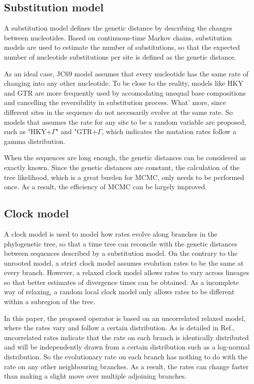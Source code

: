 \documentclass{bmcart}
\begin{document}
\subsection*{Substitution model}
A substitution model defines the genetic distance by describing the changes between nucleotides. Based on continuous-time Markov chains, substitution models are used to estimate the number of substitutions, so that the expected number of nucleotide substitutions per site is defined as the genetic distance.

As an ideal case, JC69 model assumes that every nucleotide has the same rate of changing into any other nucleotide\cite{jukes1969evolution}. To be close to the reality, models like HKY and GTR are more frequently used by accomodating unequal base compositions and cancelling the reversibility in substitution process\cite{hasegawa1985dating,zharkikh1994estimation}. What' more, since different sites in the sequence  do not necessarily evolve at the same rate. So models that assumes the rate for any site to be a random variable are proposed, such as "HKY+$\Gamma $" and "GTR+$\Gamma $, which indicates the mutation rates follow a gamma distribution.

When the sequences are long enough, the genetic distances can be considered as exactly known. Since the genetic distances are constant, the calculation of the tree likelihood, which is a great burden for MCMC, only needs to be performed once. As a result, the efficiency of MCMC can be largely improved.
\subsection{Clock model}
A clock model is used to model how rates evolve along branches in the phylogenetic tree, so that a time tree can reconcile with the genetic distances between sequences described by a substitution model. On the contrary to the unrooted model, a strict clock model assumes evolution rates to be the same at every branch. However, a relaxed clock model allows rates to vary across lineages so that better estimates of divergence times can be obtained. As a incomplete way of relaxing, a random local clock model only allows rates to be different within a subregion of the tree.

In this paper, the proposed operator is based on an uncorrelated relaxed model, where the rates vary and follow a certain distribution. As is detailed in Ref.\cite{drummond2006relaxed}, uncorrelated rates indicate that the rate on each branch is identically distributed and will be independently drawn from a certain distribution such as a log-normal distribution. So the evolutionary rate on each branch has nothing to do with the rate on any other neighbouring branches. As a result, the rates can change faster than making a slight move over multiple adjoining branches.
\end{document}
